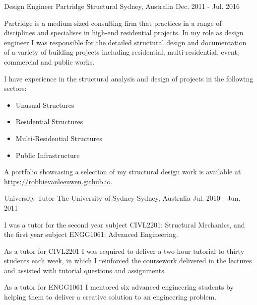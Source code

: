 

\begin{cventries}

  \cventry
    {Design Engineer} %
    {Partridge Structural} %
    {Sydney, Australia} %
    {Dec. 2011 - Jul. 2016} %
    {
      \begin{cvitems} %
        \item {Partridge is a medium sized consulting firm that practices in a range of disciplines and specialises in high-end residential projects. In my role as design engineer I was responsible for the detailed structural design and documentation of a variety of building projects including residential, multi-residential, event, commercial and public works.}
        \item {I have experience in the structural analysis and design of projects in the following sectors:}
        \begin{itemize}
          \item Unusual Structures
          \item Residential Structures
          \item Multi-Residential Structures
          \item Public Infrastructure
        \end{itemize}
        \item A portfolio showcasing a selection of my structural design work is available at \href{https://robbievanleeuwen.github.io}{https://robbievanleeuwen.github.io}.
      \end{cvitems}
    }

  \cventry
    {University Tutor} %
    {The University of Sydney} %
    {Sydney, Australia} %
    {Jul. 2010 - Jun. 2011} %
    {
      \begin{cvitems} %
        \item {I was a tutor for the second year subject CIVL2201: Structural Mechanics, and the first year subject ENGG1061: Advanced Engineering.}
        \item {As a tutor for CIVL2201 I was required to deliver a two hour tutorial to thirty students each week, in which I reinforced the coursework delivered in the lectures and assisted with tutorial questions and assignments.} 
        \item {As a tutor for ENGG1061 I mentored six advanced engineering students by helping them to deliver a creative solution to an engineering problem.}
      \end{cvitems}
    }


\end{cventries}
